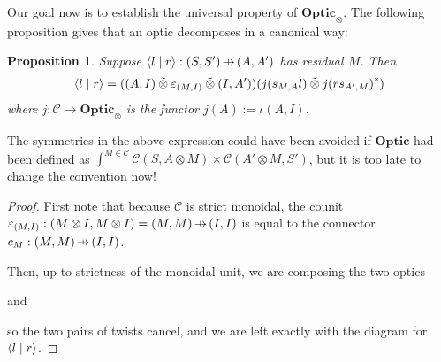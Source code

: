 \documentclass[11pt,letterpaper]{article}
\theoremstyle{plain}
\newtheorem{proposition}[theorem]{Proposition}
\theoremstyle{definition}
\newcommand{\C}{\mathscr{C}}
\newcommand{\Optic}{\mathbf{Optic}}
\newcommand{\switched}{\mathbin{\tilde{\otimes}}}
\newcommand{\rep}[2]{{\ensuremath \left\langle #1 \mid #2 \right\rangle}}
\newcommand{\hto}{\ensuremath{\,\mathaccent\shortmid\rightarrow\,}}
\begin{document}

Our goal now is to establish the universal property of $\Optic_\otimes$. The following proposition gives that an optic decomposes in a canonical way:

\begin{proposition}\label{prop:optic-decompose}
  Suppose $\rep{l}{r} : (S, S') \hto (A, A')$ has residual $M$. Then
  \begin{align*}
    \rep{l}{r} = ((A, I) \switched \varepsilon_{(M, I)} \switched (I, A'))(j(s_{M,A}l) \switched j{(rs_{A',M})}^*)
  \end{align*}
  where $j : \C \to \Optic_\otimes$ is the functor $j(A) := \iota(A, I)$.
\end{proposition}
The symmetries in the above expression could have been avoided if $\Optic$ had been defined as $\int^{M \in \C} \C(S, A \otimes M) \times \C(A' \otimes M, S')$, but it is too late to change the convention now!
\begin{proof}
  First note that because $\C$ is strict monoidal, the counit $\varepsilon_{(M, I)} : (M \otimes I, M \otimes I) = (M, M) \hto (I, I)$ is equal to the connector $c_M : (M, M) \hto (I, I)$.

  Then, up to strictness of the monoidal unit, we are composing the two optics
  \begin{center}
    
  \end{center}
  and
  \begin{center}
    
  \end{center}
  so the two pairs of twists cancel, and we are left exactly with the diagram for $\rep{l}{r}$.
\end{proof}
\end{document}
